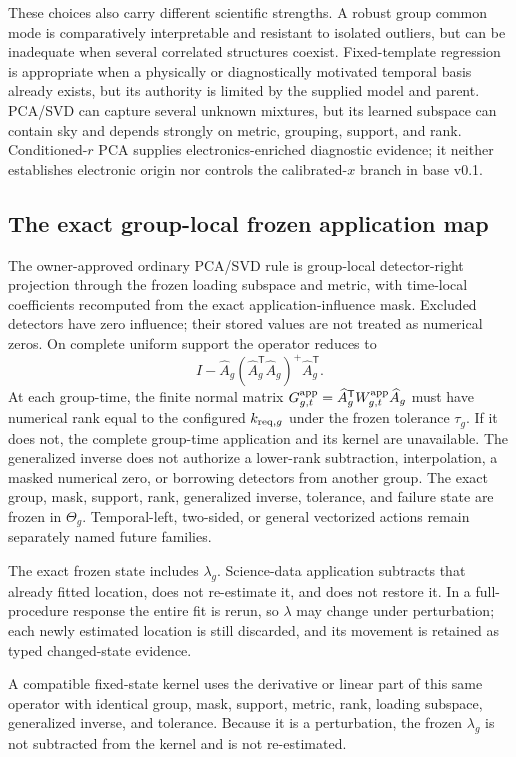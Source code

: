 \documentclass[11pt]{article}
\begin{document}
These choices also carry different scientific strengths. A robust group
common mode is comparatively interpretable and resistant to isolated
outliers, but can be inadequate when several correlated structures coexist.
Fixed-template regression is appropriate when a physically or diagnostically
motivated temporal basis already exists, but its authority is limited by the
supplied model and parent. PCA/SVD can capture several unknown mixtures, but
its learned subspace can contain sky and depends strongly on metric, grouping,
support, and rank. Conditioned-$r$ PCA supplies electronics-enriched
diagnostic evidence; it neither establishes electronic origin nor controls
the calibrated-$x$ branch in base v0.1.

\subsection{The exact group-local frozen application map}

The owner-approved ordinary PCA/SVD rule is group-local detector-right
projection through the frozen loading subspace and metric, with time-local
coefficients recomputed from the exact application-influence mask. Excluded
detectors have zero influence; their stored values are not treated as
numerical zeros. On complete uniform support the operator reduces to
\[
I-\widehat A_g(\widehat A_g^{\mathsf T}\widehat A_g)^+
\widehat A_g^{\mathsf T}.
\]
At each group-time, the finite normal matrix
$G^{\rm app}_{g,t}=\widehat A_g^{\mathsf T}W^{\rm app}_{g,t}\widehat A_g$
must have numerical rank equal to the configured $k_{{\rm req},g}$ under the
frozen tolerance $\tau_g$. If it does not, the complete group-time application
and its kernel are unavailable. The generalized inverse does not authorize a
lower-rank subtraction, interpolation, a masked numerical zero, or borrowing
detectors from another group.
The exact group, mask, support, rank, generalized inverse, tolerance, and
failure state are frozen in $\Theta_g$. Temporal-left, two-sided, or general
vectorized actions remain separately named future families.

The exact frozen state includes $\lambda_g$. Science-data application
subtracts that already fitted location, does not re-estimate it, and does not
restore it.
In a full-procedure response the entire fit is rerun, so $\lambda$ may change
under perturbation; each newly estimated location is still discarded, and its
movement is retained as typed changed-state evidence.

A compatible fixed-state kernel uses the derivative or linear part of this
same operator with identical group, mask, support, metric, rank, loading
subspace, generalized inverse, and tolerance. Because it is a perturbation,
the frozen $\lambda_g$ is not subtracted from the kernel and is not
re-estimated.
\end{document}
